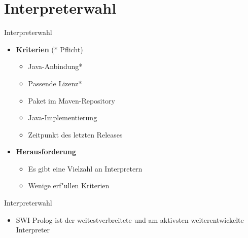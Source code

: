 \documentclass[18pt]{beamer}
\begin{document}
\section{Interpreterwahl}
\begin{frame}{Interpreterwahl}
\begin{itemize}
\item \textbf{Kriterien} (* Pflicht)
\begin{itemize}
\item Java-Anbindung*
\item Passende Lizenz*
\item Paket im Maven-Repository
\item Java-Implementierung
\item Zeitpunkt des letzten Releases
\end{itemize}
\vspace{0.5cm}
\item \textbf{Herausforderung}
\begin{itemize}
\item Es gibt eine Vielzahl an Interpretern
\item Wenige erf"ullen Kriterien
\end{itemize}
\end{itemize}
\end{frame}
\begin{frame}{Interpreterwahl}
\begin{table}[]
\end{table}
\vspace{0.5cm}
\begin{itemize}
\item SWI-Prolog ist der weitestverbreitete und am aktivsten weiterentwickelte Interpreter
\end{itemize}
\end{frame}
\end{document}
